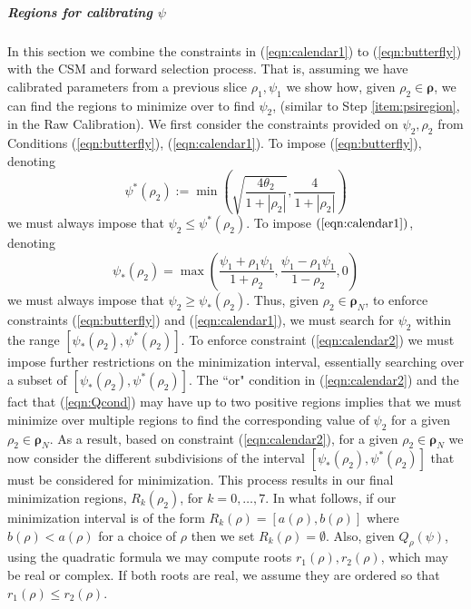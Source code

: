 \documentclass[11pt,letterpaper]{article}
\begin{document}
\subparagraph{Regions for calibrating $\psi$} In this section we combine the constraints in (\ref{eqn:calendar1}) to (\ref{eqn:butterfly}) with the CSM and forward selection process. That is, assuming we have calibrated parameters from a previous slice $\rho_1, \psi_1$ we show how, given $\rho_2 \in \pmb{\rho}$, we can find the regions to minimize over to find $\psi_2$, (similar to Step \ref{item:psiregion}, in the Raw Calibration). We first consider the constraints provided on $\psi_2,\rho_2$ from Conditions (\ref{eqn:butterfly}), (\ref{eqn:calendar1}). To impose (\ref{eqn:butterfly}), denoting
\[
\psi^*(\rho_2) := \min\left( \sqrt{\frac{4\theta_2}{1 + |\rho_2|}  }, \frac{4}{1+|\rho_2|}   \right)
\]
we must always impose that $\psi_2 \leq \psi^*(\rho_2)$. To impose $(\ref{eqn:calendar1})$, denoting
\[
\psi_* (\rho_2) = \max\left(  \frac{\psi_1 + \rho_1 \psi_1}{1 + \rho_2}, \frac{\psi_1 - \rho_1 \psi_1}{1 - \rho_2} , 0   \right)  
\]
we must always impose that $\psi_2 \geq \psi_*(\rho_2)$. 
Thus, given $\rho_2 \in \pmb{\rho}_N$, to enforce constraints (\ref{eqn:butterfly}) and (\ref{eqn:calendar1}), we must search for $\psi_2$ within the range $[\psi_*(\rho_2),\psi^*(\rho_2)]$. To enforce constraint (\ref{eqn:calendar2}) we must impose further restrictions on the minimization interval, essentially searching over a subset of $[\psi_*(\rho_2),\psi^*(\rho_2)]$. The ``or" condition in (\ref{eqn:calendar2}) and the fact that (\ref{eqn:Qcond}) may have up to two positive regions implies that we must minimize over multiple regions to find the corresponding value of $\psi_2$ for a given $\rho_2 \in \pmb{\rho}_N$. As a result, based on constraint (\ref{eqn:calendar2}), for a given $\rho_2 \in \pmb{\rho}_N$ we now consider the different subdivisions of the interval $[\psi_*(\rho_2),\psi^*(\rho_2)]$ that must be considered for minimization. This process results in our final minimization regions, $R_k(\rho_2)$, for $k = 0,\ldots, 7$. In what follows, if our minimization interval is of the form $R_k(\rho) = [a(\rho),b(\rho)]$ where $b(\rho) < a(\rho)$ for a choice of $\rho$ then we set $R_k(\rho) = \emptyset$. Also, given $Q_{\rho}(\psi)$, using the quadratic formula we may compute roots $r_1(\rho), r_2(\rho)$, which may be real or complex. If both roots are real, we assume they are ordered so that $r_1(\rho) \leq r_2(\rho)$.
\end{document}
